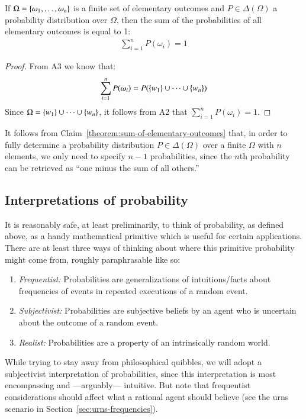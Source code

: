 \documentclass[nobib,nofonts]{tufte-handout}
\renewcommand{\markdef}[1]{\emph{#1}}
\begin{document}
\begin{claim}
  \label{theorem:sum-of-elementary-outcomes}
  If $\Omega = \left\{\omega_{1}, \dots, \omega_{n}\right\}$ is a finite set of elementary outcomes and $P \in \Delta(\Omega)$ a probability distribution over $\Omega$, then the sum of the probabilities of all elementary outcomes is equal to 1:
  \begin{align*}
    \sum_{i = 1}^{n} P(\omega_{i}) = 1
  \end{align*}
\end{claim}
\begin{proof}
  From A3 we know that:
  \begin{align*}
  \sum_{i = 1}^{n} P(\omega_{i}) = P(\left\{w_{1}\right\} \cup \dots \cup \left\{w_{n}\right\})
  \end{align*}
  Since $\Omega = \left\{w_{1}\right\} \cup \dots \cup \left\{w_{n}\right\}$, it follows from A2 that $\sum_{i = 1}^{n} P(\omega_{i}) = 1$.
\end{proof}

It follows from Claim~\ref{theorem:sum-of-elementary-outcomes} that, in order to fully determine a probability distribution $P \in \Delta(\Omega)$ over a finite $\Omega$ with $n$ elements, we only need to specify $n-1$ probabilities, since the $n$th probability can be retrieved as ``one minus the sum of all others.''

\subsection{Interpretations of probability}

It is reasonably safe, at least preliminarily, to think of probability, as defined above, as a
handy mathematical primitive which is useful for certain applications. There are at least three
ways of thinking about where this primitive probability might come from, roughly paraphrasable
like so:
\begin{enumerate}[1.]
\item \markdef{Frequentist:} Probabilities are generalizations of intuitions/facts about frequencies of events in
  repeated executions of a random event.
\item \markdef{Subjectivist:} Probabilities are subjective beliefs by an agent who is
  uncertain about the outcome of a random event.
\item \markdef{Realist:} Probabilities are a property of an intrinsically random world.
\end{enumerate}

While trying to stay away from philosophical quibbles, we will adopt a subjectivist interpretation of probabilities, since this interpretation is most encompassing and ---arguably--- intuitive.
But note that frequentist considerations should affect what a rational agent should believe (see the urns scenario in Section~\ref{sec:urns-frequencies}).
\end{document}
